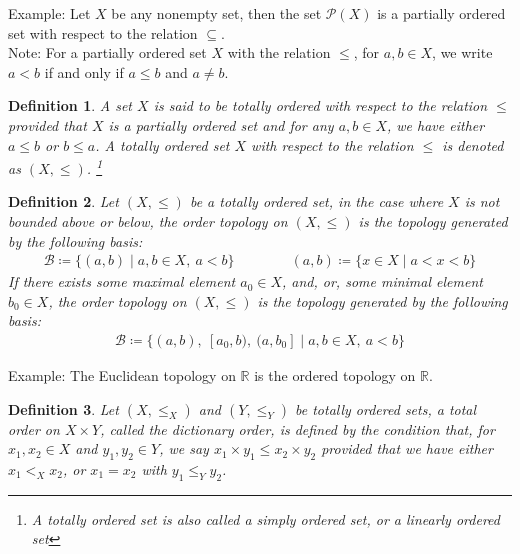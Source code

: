 \documentclass[11pt]{book}
\theoremstyle{break}
\theoremstyle{break}
\newtheorem{defn}{Definition}[corL]
\newcommand{\R}{\mathbb{R}}
\newcommand{\Power}{\mathcal{P}}
\newcommand{\note}{\color{red}Note: \color{black}}
\newcommand{\example}{\color{green}Example: \color{black}}
\begin{document}
\example Let $X$ be any nonempty set, then the set $\Power(X)$ is a partially ordered set with respect to the relation $ \subseteq$. \\

\note For a partially ordered set $X$ with the relation $\leq$, for $a,b \in X$, we write $a<b$ if and only if $a\leq b$ and $a\neq b$.

\begin{defn}
A set $X$ is said to be totally ordered with respect to the relation $\leq$ provided that $X$ is a partially ordered set and for any $a,b \in X$, we have either $a\leq b$ or $b \leq a$. A totally ordered set $X$ with respect to the relation $\leq$ is denoted as $(X,\leq)$. \footnote{A totally ordered set is also called a simply ordered set, or a linearly ordered set}
\end{defn}


\begin{defn}
Let $(X,\leq)$ be a totally ordered set, in the case where $X$ is not bounded above or below, the order topology on $(X,\leq)$ is the topology generated by the following basis:
\begin{align*}
\mathcal{B} \coloneqq \{ (a,b) \mid a,b \in X,\ a<b\}\qquad\qquad (a,b) \coloneqq \{ x \in X \mid a<x<b\}
\end{align*}
If there exists some maximal element $a_0\in X$, and, or, some minimal element $b_0 \in X$, the order topology on $(X,\leq)$ is the topology generated by the following basis:
\begin{align*}
\mathcal{B} \coloneqq \{ (a,b),\ [a_0,b),\  (a,b_0] \mid a,b \in X,\ a<b\}
\end{align*}
\end{defn}

\example The Euclidean topology on $\R$ is the ordered topology on $\R$.\\

\begin{defn}
Let $(X,\leq_X)$ and $(Y, \leq_Y)$ be totally ordered sets, a total order on $X\times Y$, called the dictionary order, is defined by the condition that, for $x_1,x_2 \in X$ and $y_1,y_2 \in Y$, we say $x_1 \times y_1 \leq x_2 \times y_2$ provided that we have either $x_1 <_X x_2$, or $x_1 = x_2$ with $y_1 \leq_Y y_2$. 
\end{defn}
\end{document}
